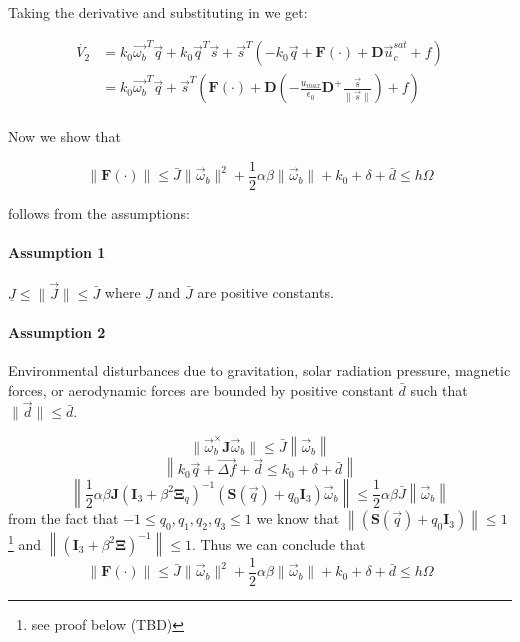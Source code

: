Taking the derivative and substituting in we get:

\begin{equation}
    \begin{split}
        \dot{V_2} &= k_0\vec{\omega_b}^T\vec{q} + k_0\vec{q}^T\vec{s} + \vec{s}^T(-k_0\vec{q} + \mathbf{F}(\cdot) + \mathbf{D}\vec{u}_c^{sat} + f) \\
        &=  k_0\vec{\omega_b}^T\vec{q} + \vec{s}^T(\mathbf{F}(\cdot) + \mathbf{D}(-\frac{u_{max}}{\epsilon_0}\mathbf{D}^+ \frac{\vec{s}}{\lVert \vec{s} \rVert}) + f) \\
    \end{split}
\end{equation}

Now we show that

\begin{equation}
    \lVert\mathbf{F}(\cdot)\rVert \leq \bar{J}\lVert\vec{\omega}_b\rVert^2 + \frac{1}{2}\alpha\beta\lVert\vec{\omega}_b\rVert + k_0 + \delta + \bar{d}	\leq h\Omega 
\end{equation}

follows from the assumptions:
\paragraph{Assumption 1} $\underline{J} \leq \lVert\vec{J}\rVert \leq \bar{J}$ where $\underline{J}$ and $\bar{J}$ are positive constants.

\paragraph{Assumption 2} Environmental disturbances due to gravitation, solar radiation pressure, magnetic forces, or aerodynamic forces are bounded by positive constant $\bar{d}$ such that $\lVert\vec{d}\rVert \leq \bar{d}$.

\begin{equation}
    \lVert\vec{\omega}_b^\times\mathbf{J}\vec{\omega}_b \rVert \leq \bar{J}\left\lVert\vec{\omega}_b\right\rVert 
\end{equation}
\begin{equation}
    \left\lVert k_0\vec{q} + \vec{\Delta f} + \vec{d} \leq k_0 + \delta + \bar{d}\right\rVert \label{eq:apx}
\end{equation}
\begin{equation}
    \left\lVert\frac{1}{2}\alpha\beta\mathbf{J}(\mathbf{I}_3 + \beta^2\mathbf{\Xi}_q)^{-1}(\mathbf{S}(\vec{q}) + q_0\mathbf{I}_3)\vec{\omega}_b\right\rVert \leq \frac{1}{2}\alpha\beta\bar{J}\left\lVert\vec{\omega}_b\right\rVert 
\end{equation}
from the fact that $-1 \leq q_0,q_1,q_2,q_3 \leq 1$ we know that $\left\lVert(\mathbf{S}(\vec{q}) + q_0\mathbf{I}_3)\right\rVert  \leq 1$\footnote{see proof below (TBD)} and $\left\lVert(\mathbf{I}_3+\beta^2\mathbf{\Xi})^{-1}\right\rVert  \leq 1$. Thus we can conclude that 
\begin{equation}
    \lVert\mathbf{F}(\cdot)\rVert \leq \bar{J}\lVert\vec{\omega}_b\rVert^2 + \frac{1}{2}\alpha\beta\lVert\vec{\omega}_b\rVert + k_0 + \delta + \bar{d}	\leq h\Omega
\end{equation}


